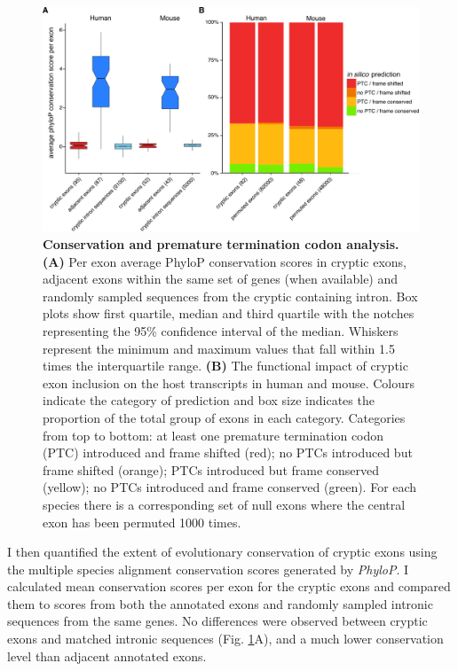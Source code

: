 \begin{figure}[h]
	\centering
	\includegraphics[width=\textwidth]{Figures/03_cryptic_exons/Figure_4_conservation_poison.png}
	\caption[Conservation and premature termination codon analysis]{
		\textbf{Conservation and premature termination codon analysis.}
		\textbf{(A)} Per exon average PhyloP conservation scores in cryptic exons, adjacent exons within the same set of genes (when available) and randomly sampled sequences from the cryptic containing intron. Box plots show first quartile, median and third quartile with the notches representing the 95\% confidence interval of the median. Whiskers represent the minimum and maximum values that fall within 1.5 times the interquartile range. 
		\textbf{(B)} The functional impact of cryptic exon inclusion on the host transcripts in human and mouse. Colours indicate the category of prediction and box size indicates the proportion of the total group of exons in each category. Categories from top to bottom: at least one premature termination codon (PTC) introduced and frame shifted (red); no PTCs introduced but frame shifted (orange); PTCs introduced but frame conserved (yellow); no PTCs introduced and frame conserved (green). For each species there is a corresponding set of null exons where the central exon has been permuted 1000 times.
}
	\label{fig:cryptic_conservation}
\end{figure}

I then quantified the extent of evolutionary conservation of cryptic exons using the multiple species alignment conservation scores generated by \textit{PhyloP}. I calculated mean conservation scores per exon for the cryptic exons and compared them to scores from both the annotated exons and randomly sampled intronic sequences from the same genes. No differences were observed between cryptic exons and matched intronic sequences (Fig. \ref{fig:cryptic_conservation}A), and a much lower conservation level than adjacent annotated exons.

